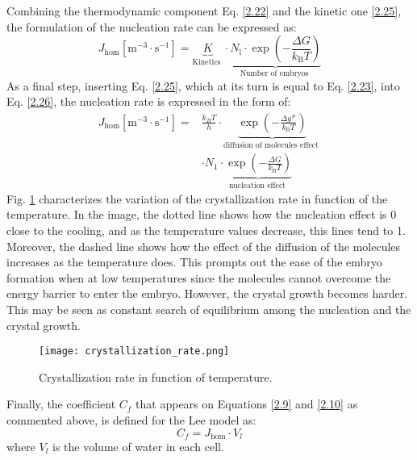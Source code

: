 \setlength{\parindent}{0.5cm} Combining the thermodynamic component Eq. \ref{2.22} and the kinetic one \ref{2.25}, the formulation of the nucleation rate can be expressed as:
\begin{equation}
	\label{2.26}
	J_{\mathrm{hom}}\left[\mathrm{m}^{-3} \cdot \mathrm{s}^{-1}\right]=\underbrace{K}_{\text {Kinetics }} \cdot \underbrace{N_{\mathrm{l}} \cdot \exp \left(-\frac{\Delta G}{k_{\mathrm{B}} T}\right)}_{\text {Number of embryos }}
\end{equation}
As a final step, inserting Eq. \ref{2.25}, which at its turn is equal to Eq. \ref{2.23}, into Eq. \ref{2.26}, the nucleation rate is expressed in the form of:
\begin{equation}
	\label{2.27}
	\begin{aligned}
	J_{\mathrm{hom}}\left[\mathrm{m}^{-3} \cdot \mathrm{s}^{-1}\right]
	=& \frac{k_{B} T}{h} \cdot \underbrace{\exp \left(-\frac{\Delta g^{\#}}{k_{\mathrm{B}} T}\right)}_{\text {diffusion of molecules effect }} \\ 
	& \cdot N_{1} \cdot \underbrace{\exp \left(-\frac{\Delta G}{k_{\mathrm{B}} T}\right)}_{\text {nucleation effect }}
	\end{aligned}
\end{equation}
Fig. \ref{2.2fig} characterizes the variation of the crystallization rate in function of the temperature. In the image, the dotted line shows how the nucleation effect is 0 close to the cooling, and as the temperature values decrease, this lines tend to 1. Moreover, the dashed line shows how the effect of the diffusion of the molecules increases as the temperature does. This prompts out the ease of the embryo formation when at low temperatures since the molecules cannot overcome the energy barrier to enter the embryo. However, the crystal growth becomes harder. This may be seen as constant search of equilibrium among the nucleation and the crystal growth.
\clearpage
\begin{figure}[h!]
	\centering
	\texttt{[image: crystallization\_rate.png]}
	\caption{Crystallization rate in function of temperature.}	
	\label{2.2fig}
\end{figure} 
\noindent Finally, the coefficient $C_f$ that appears on Equations \ref{2.9} and \ref{2.10} as commented above, is defined for the Lee model as:
\begin{equation}
	\label{2.28}
	C_f=J_{\mathrm{hom}} \cdot V_{l}
\end{equation}
where $V_{l}$ is the volume of water in each cell.

